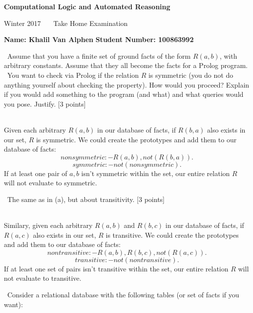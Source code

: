 \documentclass[12pt,fullpage]{article}
\begin{document}
\thispagestyle{empty}
\pagestyle{empty}

\vspace*{-1.5cm}
\begin{center} \bf
\large  Computational Logic and Automated Reasoning

 Winter  2017~~~ Take Home Examination  \ \ \ \ %
\end{center}
{\bf Name: Khalil Van Alphen} \hspace{4.5cm} {\bf Student Number: 100863992}

\vspace{2mm}  \ Assume that you have a finite set of ground facts of the form $R(a,b)$, with arbitrary constants. Assume that they all become the facts for a Prolog program. \ You want to check via Prolog
 if the relation $R$ is symmetric (you do not do anything yourself about checking the property). How would you proceed? Explain if you would add something to the program (and what) and what queries would you pose. Justify. \hfill [3 points] \vspace{2mm}

\\
Given each arbitrary $R(a,b)$ in our database of facts, if $R(b,a)$ also exists in our set, $R$ is symmetric. We could create the prototypes and add them to our database of facts:
$$nonsymmetric :- R(a,b), not(R(b,a)).$$
$$symmetric :- not(nonsymmetric).$$
If at least one pair of $a,b$ isn't symmetric within the set, our entire relation $R$ will not evaluate to symmetric.\vspace{2mm}

 \ The same as in (a), but about transitivity. \hfill [3 points]

\vspace{2mm} \\
Similary, given each arbitrary $R(a,b)$ and $R(b,c)$ in our database of facts, if $R(a,c)$ also exists in our set, $R$ is transitive. We could create the prototypes and add them to our database of facts:
$$nontransitive :- R(a,b),R(b,c),not(R(a,c)).$$
$$transitive :- not(nontransitive).$$
If at least one set of pairs isn't transitive within the set, our entire relation $R$ will not evaluate to transitive.

\vspace{2mm}  \ Consider a relational database with the following tables (or set of facts if you want):
\end{document}
